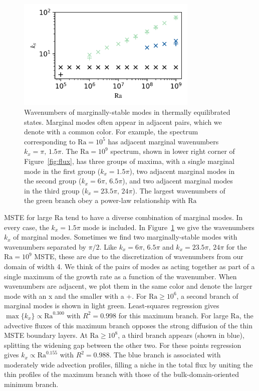 \documentclass[reprint,amsmath,amssymb,aps]{revtex4-1}
\newcommand\Ra{\mathrm{Ra}}
\begin{document}
\begin{figure}
    \centering
    \includegraphics[width=3.4in]{kx_m_ra1.png}
    \caption{Wavenumbers of marginally-stable modes in thermally equilibrated states. 
    Marginal modes often appear in adjacent pairs, which we denote with a common color. 
    For example, the spectrum corresponding to $\Ra = 10^5$ has adjacent marginal wavenumbers $k_x = \pi, \, 1.5\pi$. 
    The $\Ra = 10^9$ spectrum, shown in lower right corner of Figure~\ref{fig:flux}, has three groups of maxima, with a single marginal mode in the first group ($k_x = 1.5\pi$), two adjacent marginal modes in the second group ($k_x = 6\pi, \, 6.5\pi$), and two adjacent marginal modes in the third group ($k_x = 23.5\pi, \, 24\pi$). 
    The largest wavenumbers of the green branch obey a power-law relationship with $\Ra$}
    \label{fig:kx_marginals}
\end{figure}

MSTE for large $\Ra$ tend to have a diverse combination of marginal modes.
In every case, the $k_x = 1.5\pi$ mode is included. 
In Figure~\ref{fig:kx_marginals} we give the wavenumbers $k_x$ of marginal modes. 
Sometimes we find two marginally-stable modes with wavenumbers separated by $\pi/2$.
Like $k_x = 6\pi, \, 6.5\pi$ and $k_x=23.5\pi, \, 24\pi$ for the $\Ra=10^9$ MSTE, these are due to the discretization of wavenumbers from our domain of width 4.
We think of the pairs of modes as acting together as part of a single maximum of the growth rate as a function of the wavenumber.
When wavenumbers are adjacent, we plot them in the same color and denote the larger mode with an x and the smaller with a +.
For $\Ra \geq 10^6$, a second branch of marginal modes is shown in light green. 
Least-squares regression gives $\max\{k_x\} \propto \Ra^{0.300}$ with $R^2 = 0.998$ for this maximum branch.
For large $\Ra$, the advective fluxes of this maximum branch opposes the strong diffusion of the thin MSTE boundary layers. 
At $\Ra \geq 10^8$, a third branch appears (shown in blue), splitting the widening gap between the other two. 
For these points regression gives $k_x \propto \Ra^{0.155}$ with $R^2 = 0.988$.
The blue branch is associated with moderately wide advection profiles, filling a niche in the total flux by uniting the thin profiles of the maximum branch with those of the bulk-domain-oriented minimum branch.
\end{document}
